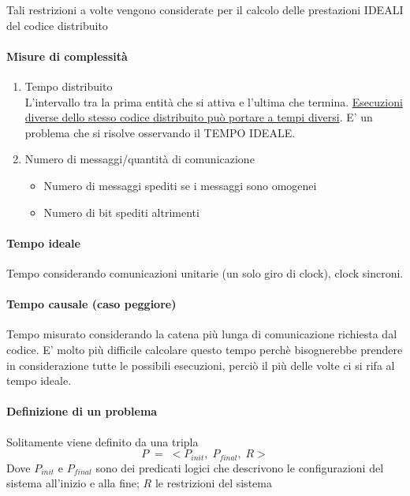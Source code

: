 \begin{osservazione}
Tali restrizioni a volte vengono considerate per il calcolo delle prestazioni IDEALI del codice distribuito
\end{osservazione}

\paragraph{Misure di complessità}
\begin{enumerate}
    \item Tempo distribuito\\
    L'intervallo tra la prima entità che si attiva e l'ultima che termina. \uline{Esecuzioni diverse dello stesso codice distribuito può portare a tempi diversi}. E' un problema che si risolve osservando il TEMPO IDEALE.
    \item Numero di messaggi/quantità di comunicazione
    \begin{itemize}
        \item Numero di messaggi spediti se i messaggi sono omogenei
        \item Numero di bit spediti altrimenti
    \end{itemize}
\end{enumerate}

\paragraph{Tempo ideale} 
Tempo considerando comunicazioni unitarie (un solo giro di clock), clock sincroni.

\paragraph{Tempo causale (caso peggiore)}
Tempo misurato considerando la catena più lunga di comunicazione richiesta dal codice. E' molto più difficile calcolare questo tempo perchè bisognerebbe prendere in considerazione tutte le possibili esecuzioni, perciò il più delle volte ci si rifa al tempo ideale.

\paragraph{Definizione di un problema}
Solitamente viene definito da una tripla
$$P \;=\; <P_{init},\;P_{final},\; R>$$
Dove $P_{init}$ e $P_{final}$ sono dei predicati logici che descrivono le configurazioni del sistema all'inizio e alla fine; $R$ le restrizioni del sistema

